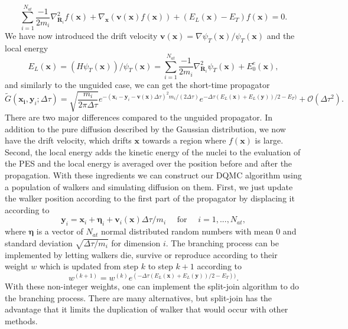 \documentclass [12pt]{report}
\begin{document}
\begin{equation} \label{eq:2.8}
\sum_{i=1}^{N_{at}} \frac{-1}{2m_i} \nabla^2_{\bm{R}_i} f(\bm{x}) + \nabla_{\bm{x}} (\bm{v}(\bm{x}) f(\bm{x})) + (E_L(\bm{x}) - E_T)f(\bm{x}) = 0.
\end{equation}
We have now introduced the drift velocity $\bm{v}(\bm{x}) = \nabla \psi_T(\bm{x})/ \psi_T(\bm{x})$ and the local energy 
\begin{equation}\label{el}
E_L(\bm{x}) = (H\psi_T(\bm{x}))/\psi_T(\bm{x}) = \sum_{i=1}^{N_{at}} \frac{-1}{2m_i} \nabla^2_{\bm{R}_i} \psi_T(\bm{x}) + E_0^e(\bm{x}),
\end{equation}
and similarly to the unguided case, we can get the short-time propagator
\begin{equation} \label{eq:2.9}
\tilde{G}(\bm{x_i},\bm{y}_i;\Delta \tau) = \sqrt{\frac{m_i}{2 \pi \Delta \tau}} e^{-(\bm{x}_i-\bm{y}_i-\bm{v}(\bm{x})\Delta \tau)^2 m_i/(2 \Delta \tau)} e^{-\Delta \tau (E_L(\bm{x})+E_L(\bm{y}))/2 - E_T)} + \mathcal{O}(\Delta \tau^2).
\end{equation}
There are two major differences compared to the unguided propagator. In addition to the pure diffusion described by the Gaussian distribution, we now have the drift velocity, which drifts $\bm{x}$ towards a region where $f(\bm{x})$ is large. Second, the local energy adds the kinetic energy of the nuclei to the evaluation of the PES and the local energy is averaged over the position before and after the propagation. 
With these ingredients we can construct our DQMC algorithm using a population of walkers and simulating diffusion on them. First, we just update the walker position according to the first part of the propagator by displacing it according to
\begin{equation}\label{eq:2.10}
\bm{y}_i = \bm{x}_i + \bm{\eta}_i + \bm{v}_i(\bm{x})\Delta \tau/m_i \quad \textrm{ for } \quad i=1,...,N_{at},
\end{equation}
where $\bm{\eta}$ is a vector of $N_{at}$ normal distributed random numbers with mean $0$ and standard deviation $\sqrt{\Delta \tau / m_i}$ for dimension $i$.
The branching process can be implemented by letting walkers die, survive or reproduce according to their weight $w$ which is updated from step $k$ to step $k+1$ according to 
\begin{equation}\label{eq:2.11} 
w^{(k+1)} = w^{(k)} e^{(-\Delta \tau (E_L(\bm{x}) + E_L(\bm{y}))/2 - E_T))}.
\end{equation}
With these non-integer weights, one can implement the split-join algorithm \cite{split_join} to do the branching process. There are many alternatives, but split-join has the advantage that it limits the duplication of walker that would occur with other methods.
\end{document}
